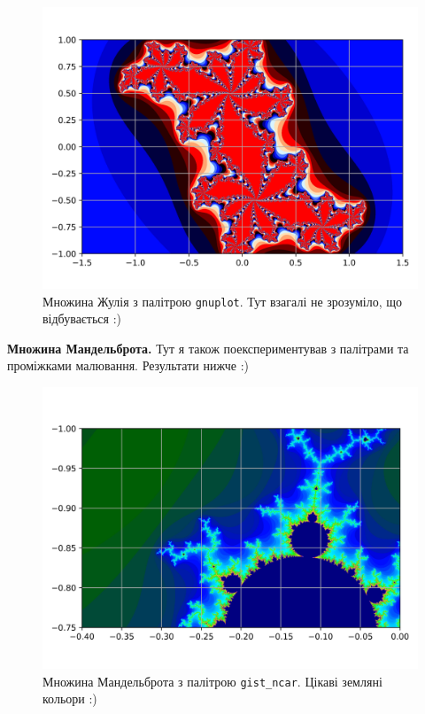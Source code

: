 \documentclass[oneside,solution]{tmpl}
\begin{document}
\begin{figure}
    \centering
    \includegraphics[width=\textwidth]{images/hw_10/julia_3.jpg}
    \caption{Множина Жулія з палітрою \texttt{gnuplot}. Тут взагалі не зрозуміло, що відбувається :)}
    \label{fig:3}
\end{figure}

\textbf{Множина Мандельброта.} Тут я також поекспериментував з палітрами та проміжками малювання. Результати нижче :)

\begin{figure}
    \centering
    \includegraphics[width=\textwidth]{images/hw_10/mandelbrot_1.jpg}
    \caption{Множина Мандельброта з палітрою \texttt{gist\_ncar}. Цікаві земляні кольори :)}
    \label{fig:3}
\end{figure}
\end{document}
